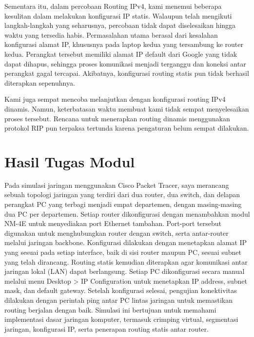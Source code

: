Sementara itu, dalam percobaan Routing IPv4, kami menemui beberapa kesulitan dalam melakukan konfigurasi IP statis. Walaupun telah mengikuti langkah-langkah yang seharusnya, percobaan tidak dapat diselesaikan hingga waktu yang tersedia habis. Permasalahan utama berasal dari kesalahan konfigurasi alamat IP, khususnya pada laptop kedua yang tersambung ke router kedua. Perangkat tersebut memiliki alamat IP default dari Google yang tidak dapat dihapus, sehingga proses komunikasi menjadi terganggu dan koneksi antar perangkat gagal tercapai. Akibatnya, konfigurasi routing statis pun tidak berhasil diterapkan sepenuhnya.

Kami juga sempat mencoba melanjutkan dengan konfigurasi routing IPv4 dinamis. Namun, keterbatasan waktu membuat kami tidak sempat menyelesaikan proses tersebut. Rencana untuk menerapkan routing dinamis menggunakan protokol RIP pun terpaksa tertunda karena pengaturan belum sempat dilakukan.



\section{Hasil Tugas Modul}
Pada simulasi jaringan menggunakan Cisco Packet Tracer, saya merancang sebuah topologi jaringan yang terdiri dari dua router, dua switch, dan delapan perangkat PC yang terbagi menjadi empat departemen, dengan masing-masing dua PC per departemen. Setiap router dikonfigurasi dengan menambahkan modul NM-4E untuk menyediakan port Ethernet tambahan. Port-port tersebut digunakan untuk menghubungkan router dengan switch, serta antar-router melalui jaringan backbone. Konfigurasi dilakukan dengan menetapkan alamat IP yang sesuai pada setiap interface, baik di sisi router maupun PC, sesuai subnet yang telah dirancang. Routing statis kemudian diterapkan agar komunikasi antar jaringan lokal (LAN) dapat berlangsung. Setiap PC dikonfigurasi secara manual melalui menu Desktop > IP Configuration untuk menetapkan IP address, subnet mask, dan default gateway. Setelah konfigurasi selesai, pengujian konektivitas dilakukan dengan perintah ping antar PC lintas jaringan untuk memastikan routing berjalan dengan baik. Simulasi ini bertujuan untuk memahami implementasi dasar jaringan komputer, termasuk crimping virtual, segmentasi jaringan, konfigurasi IP, serta penerapan routing statis antar router.


